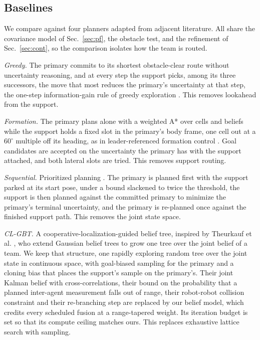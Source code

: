\documentclass[letterpaper, 10 pt, conference]{ieeeconf}
\theoremstyle{remark}
\begin{document}
\subsection{Baselines}

We compare against four planners adapted from adjacent literature. All share
the covariance model of Sec.~\ref{sec:pf}, the obstacle test, and the
refinement of Sec.~\ref{sec:cont}, so the comparison isolates how the team
is routed.

\textit{Greedy.} The primary commits to its shortest obstacle-clear route
without uncertainty reasoning, and at every step the support picks, among
its three successors, the move that most reduces the primary's uncertainty
at that step, the one-step information-gain rule of greedy exploration
\cite{bourgault2002info}. This removes lookahead from the support.

\textit{Formation.} The primary plans alone with a weighted A* over cells
and beliefs while the support holds a fixed slot in the primary's body
frame, one cell out at a $60^\circ$ multiple off its heading, as in
leader-referenced formation control \cite{balch1998formation}. Goal candidates
are accepted on the uncertainty the primary has with the support attached,
and both lateral slots are tried. This removes support routing.

\textit{Sequential.} Prioritized planning
\cite{erdmann1987multiple,silver2005cooperative}. The primary is planned
first with the support parked at its start pose, under a bound slackened to
twice the threshold, the support is then planned against the committed
primary to minimize the primary's terminal uncertainty, and the primary is
re-planned once against the finished support path. This removes the joint
state space.

\textit{CL-GBT.} A cooperative-localization-guided belief tree, inspired by Theurkauf et al. \cite{theurkauf2025coop}, who extend Gaussian
belief trees \cite{ho2022gbt} to grow one tree over the joint belief of a
team. We keep that structure, one rapidly exploring random tree over the
joint state in continuous space, with goal-biased sampling for the primary
and a cloning bias that places the support's sample on the primary's. Their joint Kalman belief with cross-correlations, their bound
on the probability that a planned inter-agent measurement falls out of
range, their robot-robot collision constraint and their re-branching step
are replaced by our belief model, which credits every scheduled fusion at a
range-tapered weight. Its iteration budget is set so that its compute
ceiling matches ours. This replaces exhaustive lattice search with sampling.
\end{document}
